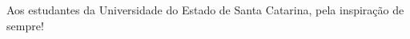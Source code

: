 \begin{dedicatoria}
   \vspace*{\fill}

{%
	\noindent\hspace{.5\textwidth}
	{\begin{minipage}{.5\textwidth}
			\begin{flushleft}
				Aos estudantes da Universidade do Estado de Santa Catarina, pela inspiração de sempre!
			\end{flushleft}
	\end{minipage}}%
\vspace*{3cm}
}%

\end{dedicatoria}
